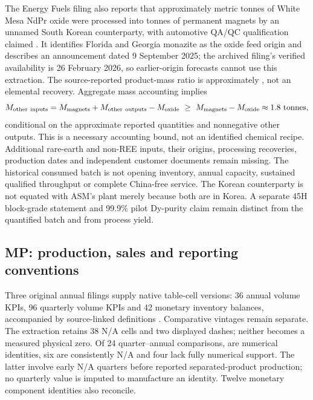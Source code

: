 \documentclass[11pt]{article}
\begin{document}
The Energy Fuels filing also reports that approximately \BatchOxideInput{} metric tonnes of White Mesa NdPr oxide were processed into \BatchMagnetOutput{} tonnes of permanent magnets by an unnamed South Korean counterparty, with automotive QA/QC qualification claimed \citep{EF2025}. It identifies Florida and Georgia monazite as the oxide feed origin and describes an announcement dated 9 September 2025; the archived filing's verified availability is 26 February 2026, so earlier-origin forecasts cannot use this extraction. The source-reported product-mass ratio is approximately \BatchProductRatio{}, not an elemental recovery. Aggregate mass accounting implies
\begin{equation}
M_{\mathrm{other\ inputs}}=M_{\mathrm{magnets}}+M_{\mathrm{other\ outputs}}-M_{\mathrm{oxide}}
\ \geq\ M_{\mathrm{magnets}}-M_{\mathrm{oxide}}\approx\BatchAdditionalInput{}\ \mathrm{tonnes},
\end{equation}
conditional on the approximate reported quantities and nonnegative other outputs. This is a necessary accounting bound, not an identified chemical recipe. Additional rare-earth and non-REE inputs, their origins, processing recoveries, production dates and independent customer documents remain missing. The historical consumed batch is not opening inventory, annual capacity, sustained qualified throughput or complete China-free service. The Korean counterparty is not equated with ASM's plant merely because both are in Korea. A separate 45H block-grade statement and 99.9\% pilot Dy-purity claim remain distinct from the quantified batch and from process yield.

\subsection{MP: production, sales and reporting conventions}
Three original annual filings supply \MPNativeCells{} native table-cell versions: 36 annual volume KPIs, 96 quarterly volume KPIs and 42 monetary inventory balances, accompanied by \MPDefinitions{} source-linked definitions \citep{MP2023,MP2024,MP2025}. Comparative vintages remain separate. The extraction retains 38 N/A cells and two displayed dashes; neither becomes a measured physical zero. Of 24 quarter--annual comparisons, \MPNumericIdentities{} are numerical identities, six are consistently N/A and four lack fully numerical support. The latter involve early N/A quarters before reported separated-product production; no quarterly value is imputed to manufacture an identity. Twelve monetary component identities also reconcile.
\end{document}
